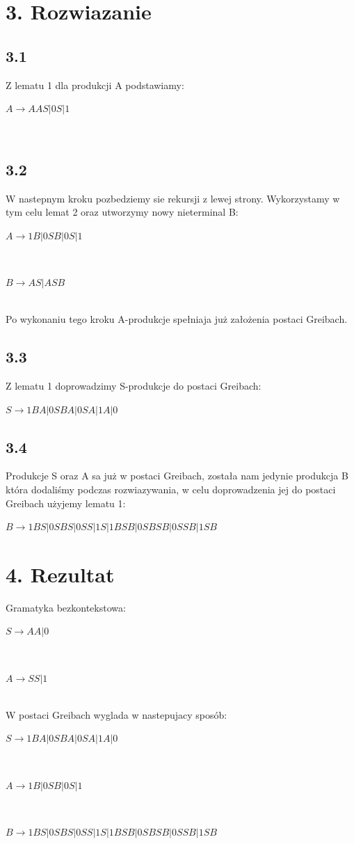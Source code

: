 \documentclass{article} %
\begin{document}
	\section*{3. Rozwiazanie}

	\subsection*{3.1}

	Z lematu 1 dla produkcji A podstawiamy:\\ \centerline{$A\rightarrow AAS|0S|1$} \\ 

	\subsection*{3.2}	

	W nastepnym kroku pozbedziemy sie rekursji z lewej strony. Wykorzystamy w tym celu lemat 2 oraz utworzymy nowy nieterminal B:\\ \centerline{$A\rightarrow 1B|0SB|0S|1$} \\ \centerline{$B\rightarrow AS|ASB$} \\ Po wykonaniu tego kroku A-produkcje spełniaja już założenia postaci Greibach.

	\subsection*{3.3}

	Z lematu 1 doprowadzimy S-produkcje do postaci Greibach: \\ \centerline{$S\rightarrow 1BA|0SBA|0SA|1A|0$}

	\subsection*{3.4}

	Produkcje S oraz A sa już w postaci Greibach, została nam jedynie produkcja B która dodaliśmy podczas rozwiazywania, w celu doprowadzenia jej do postaci Greibach użyjemy lematu 1: \\ \centerline{$B\rightarrow 1BS|0SBS|0SS|1S|1BSB|0SBSB|0SSB|1SB$}

	\section*{4. Rezultat}

	Gramatyka bezkontekstowa: \\ \centerline{$S \rightarrow AA|0$} \\ \centerline{$A \rightarrow SS|1$} \\ W postaci Greibach wyglada w nastepujacy sposób: \\ \centerline{$S\rightarrow 1BA|0SBA|0SA|1A|0$} \\  \centerline{$A\rightarrow 1B|0SB|0S|1$} \\ \centerline{$B\rightarrow 1BS|0SBS|0SS|1S|1BSB|0SBSB|0SSB|1SB$}

	

		
\end{document}
